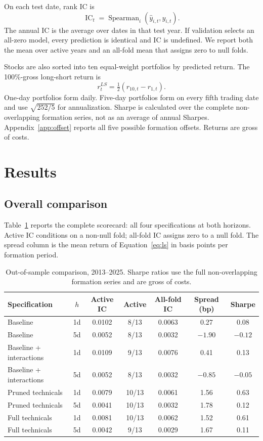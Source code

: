 \documentclass[11pt]{article}
\begin{document}
On each test date, rank IC is
\begin{equation}
 \operatorname{IC}_t
 =\operatorname{Spearman}_i(\widehat y_{i,t},y_{i,t}).
\end{equation}
The annual IC is the average over dates in that test year. If validation
selects an all-zero model, every prediction is identical and IC is undefined.
We report both the mean over active years and an all-fold mean that assigns
zero to null folds.

Stocks are also sorted into ten equal-weight portfolios by predicted return.
The 100\%-gross long-short return is
\begin{equation}
 r^{LS}_t=\tfrac12(r_{10,t}-r_{1,t}).
 \label{eq:ls}
\end{equation}
One-day portfolios form daily. Five-day portfolios form on every fifth
trading date and use $\sqrt{252/5}$ for annualization. Sharpe is calculated
over the complete non-overlapping formation series, not as an average of
annual Sharpes. Appendix~\ref{app:offset} reports all five possible formation
offsets. Returns are gross of costs.

\section{Results}

\subsection{Overall comparison}

Table~\ref{tab:comparison} reports the complete scorecard: all four
specifications at both horizons. Active IC conditions on a non-null fold; all-fold IC assigns zero
to a null fold. The spread column is the mean return of
Equation~\eqref{eq:ls} in basis points per formation period.

\begin{table}[ht]
\centering
\caption{Out-of-sample comparison, 2013--2025. Sharpe ratios use the full
non-overlapping formation series and are gross of costs.}
\label{tab:comparison}
\small
\begin{tabular}{@{}lcccccc@{}}
\toprule
Specification & $h$ & Active IC & Active & All-fold IC & Spread (bp) & Sharpe \\
\midrule
Baseline & 1d & 0.0102 & 8/13 & 0.0063 & 0.27 & 0.08 \\
Baseline & 5d & 0.0052 & 8/13 & 0.0032 & $-1.90$ & $-0.12$ \\
Baseline + interactions & 1d & 0.0109 & 9/13 & 0.0076 & 0.41 & 0.13 \\
Baseline + interactions & 5d & 0.0052 & 8/13 & 0.0032 & $-0.85$ & $-0.05$ \\
Pruned technicals & 1d & 0.0079 & 10/13 & 0.0061 & 1.56 & 0.63 \\
Pruned technicals & 5d & 0.0041 & 10/13 & 0.0032 & 1.78 & 0.12 \\
Full technicals & 1d & 0.0081 & 10/13 & 0.0062 & 1.52 & 0.61 \\
Full technicals & 5d & 0.0042 & 9/13 & 0.0029 & 1.67 & 0.11 \\
\bottomrule
\end{tabular}
\end{table}
\end{document}
